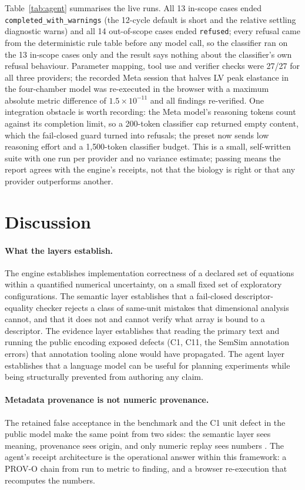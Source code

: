\documentclass[11pt,letterpaper]{article}
\begin{document}
Table~\ref{tab:agent} summarises the live runs. All 13 in-scope cases ended \texttt{completed\_with\_warnings} (the 12-cycle default is short and the relative settling diagnostic warns) and all 14 out-of-scope cases ended \texttt{refused}; every refusal came from the deterministic rule table before any model call, so the classifier ran on the 13 in-scope cases only and the result says nothing about the classifier's own refusal behaviour. Parameter mapping, tool use and verifier checks were 27/27 for all three providers; the recorded Meta session that halves LV peak elastance in the four-chamber model was re-executed in the browser with a maximum absolute metric difference of $1.5\times10^{-11}$ and all findings re-verified. One integration obstacle is worth recording: the Meta model's reasoning tokens count against its completion limit, so a 200-token classifier cap returned empty content, which the fail-closed guard turned into refusals; the preset now sends low reasoning effort and a 1{,}500-token classifier budget. This is a small, self-written suite with one run per provider and no variance estimate; passing means the report agrees with the engine's receipts, not that the biology is right or that any provider outperforms another.

\section{Discussion}
\label{sec:discussion}

\paragraph{What the layers establish.} The engine establishes implementation correctness of a declared set of equations within a quantified numerical uncertainty, on a small fixed set of exploratory configurations. The semantic layer establishes that a fail-closed descriptor-equality checker rejects a class of same-unit mistakes that dimensional analysis cannot, and that it does not and cannot verify what array is bound to a descriptor. The evidence layer establishes that reading the primary text and running the public encoding exposed defects (C1, C11, the SemSim annotation errors) that annotation tooling alone would have propagated. The agent layer establishes that a language model can be useful for planning experiments while being structurally prevented from authoring any claim.

\paragraph{Metadata provenance is not numeric provenance.} The retained false acceptance in the benchmark and the C1 unit defect in the public model make the same point from two sides: the semantic layer sees meaning, provenance sees origin, and only numeric replay sees numbers \citep{neal2019harmonizing,neal2015cardiomyocyte}. The agent's receipt architecture is the operational answer within this framework: a PROV-O chain from run to metric to finding, and a browser re-execution that recomputes the numbers.
\end{document}
